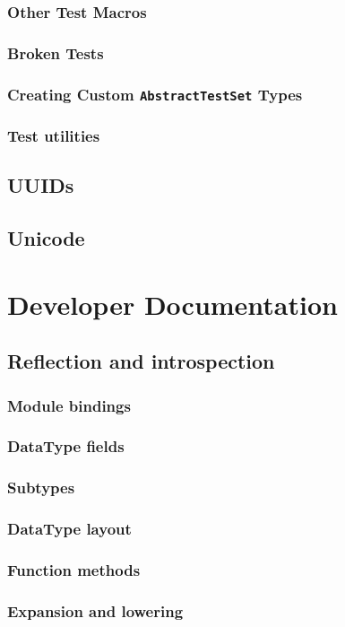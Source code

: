     \section{Other Test Macros}
    \section{Broken Tests}
    \section{Creating Custom \texttt{AbstractTestSet} Types}
    \section{Test utilities}
\chapter{UUIDs}
\chapter{Unicode}




\part{Developer Documentation}
\chapter{Reflection and introspection}
    \section{Module bindings}
    \section{DataType fields}
    \section{Subtypes}
    \section{DataType layout}
    \section{Function methods}
    \section{Expansion and lowering}
